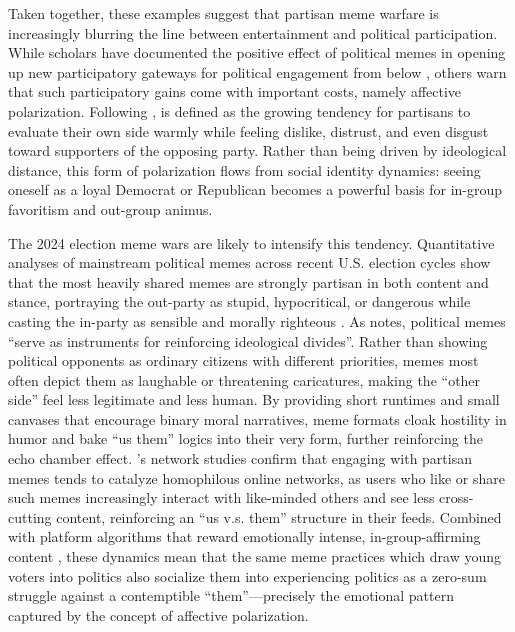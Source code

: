\documentclass[12pt,twoside]{article}
\begin{document}

Taken together, these examples suggest that partisan meme warfare is increasingly blurring the line between entertainment and political participation. While scholars have documented the positive effect of political memes in opening up new participatory gateways for political engagement from below \parencite{sreekumar2013onlinepoliticalmemes, ahmed2024breakingbarriersmemes, mushtaq2025betweenhumorharm}, others warn that such participatory gains come with important  costs, namely affective polarization. Following \textcites[405]{iyengar2012affectnotideology}[691]{iyengar2015fearloathing}[130]{iyengar2019originsaffectivepolarization}, is defined as the growing tendency for partisans to evaluate their own side warmly while feeling dislike, distrust, and even disgust toward supporters of the opposing party. Rather than being driven  by ideological distance, this form of polarization flows from social identity dynamics: seeing oneself as a loyal Democrat or Republican becomes a powerful basis for in-group favoritism and out-group animus.  

The 2024 election meme wars are likely to intensify this tendency. Quantitative analyses of mainstream political memes across recent U.S. election cycles show that the most heavily shared memes are strongly partisan in both content and stance, portraying the out-party as stupid, hypocritical, or dangerous while casting the in-party as sensible and morally righteous \parencite{collier2024compositionmainstreammemes}. As \textcite[1]{alafnan2025roleMemesPoliticalDiscourse} notes, political memes ``serve as instruments for reinforcing ideological divides''. Rather than showing political opponents as ordinary citizens with different priorities, memes most often depict them as laughable or threatening caricatures, making the ``other side'' feel less legitimate and less human. By providing short runtimes and small canvases that encourage binary moral narratives, meme formats cloak hostility in humor and bake ``us them'' logics into their very form, further reinforcing the echo chamber effect. \textcite{kim2023partisanmemes}'s network studies confirm that engaging with partisan memes tends to catalyze homophilous online networks, as users who like or share such memes increasingly interact with like-minded others and see less cross-cutting content, reinforcing an ``us v.s. them'' structure in their feeds. Combined with platform algorithms that reward emotionally intense, in-group-affirming content \parencite{ye2025auditingexposurebias}, these dynamics mean that the same meme practices which draw young voters into politics also socialize them into experiencing politics as a zero-sum struggle against a contemptible ``them''---precisely the emotional pattern captured by the concept of affective polarization.
\end{document}

